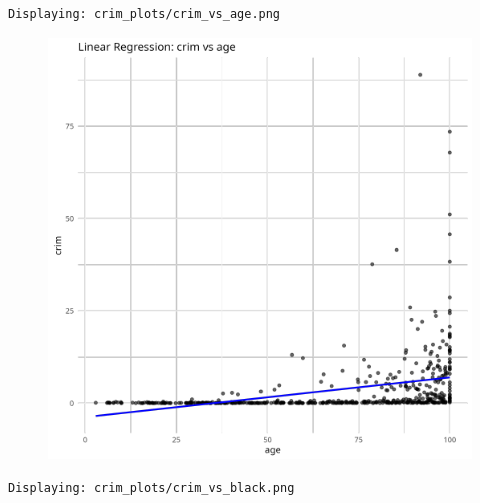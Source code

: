 \documentclass[
]{article}
\begin{document}
\begin{verbatim}
Displaying: crim_plots/crim_vs_age.png 
\end{verbatim}

\begin{figure}[H]

{\centering \includegraphics{hw1_files/figure-pdf/unnamed-chunk-16-1.pdf}

}

\end{figure}

\begin{verbatim}
Displaying: crim_plots/crim_vs_black.png 
\end{verbatim}
\end{document}
